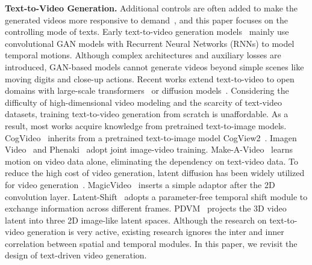 \documentclass{article}
\begin{document}
\noindent\textbf{Text-to-Video Generation.}
Additional controls are often added to make the generated videos more responsive to demand~\cite{2016_VG_ICLR,2017Create_What_You_Tell,Vid2Vid,FaceAnimation2022}, and this paper focuses on the controlling mode of texts.
Early text-to-video generation models~\cite{2018Video_Text,2017Create_What_You_Tell} mainly use convolutional GAN models with Recurrent Neural Networks (RNNs) to model temporal motions. 
Although complex architectures and auxiliary losses are introduced, GAN-based models cannot generate videos beyond simple scenes like moving digits and close-up actions.
Recent works extend text-to-video to open domains with large-scale transformers~\cite{2022MAGVIT} or diffusion models~\cite{2022ImagenVideo}.
Considering the difficulty of high-dimensional video modeling and the scarcity of text-video datasets, training text-to-video generation from scratch is unaffordable.
As a result, most works acquire knowledge from pretrained text-to-image models.
CogVideo~\cite{2023CogVideo} inherits from a pretrained text-to-image model CogView2~\cite{cogview2}.
Imagen Video~\cite{2022ImagenVideo} and Phenaki~\cite{Phenaki} adopt joint image-video training.
Make-A-Video~\cite{MakeAVideo} learns motion on video data alone, eliminating the dependency on text-video data.
To reduce the high cost of video generation, latent diffusion has been widely utilized for video generation~\cite{2023LatentShift, VideoLDM, esser2023structure,he2022lvdm, he2022latent, 2023Text2VideoZero, 2023FollowYourPose,wu2022nuwa, wu2022tuneavideo, PVDM,  zhou2022magicvideo}.
MagicVideo~\cite{zhou2022magicvideo} inserts a simple adaptor after the 2D convolution layer.
Latent-Shift~\cite{2023LatentShift} adopts a parameter-free temporal shift module to exchange information across different frames.
PDVM~\cite{PVDM} projects the 3D video latent into three 2D image-like latent spaces.
Although the research on text-to-video generation is very active, existing research ignores the inter and inner correlation between spatial and temporal modules.
In this paper, we revisit the design of text-driven video generation. 
\end{document}
